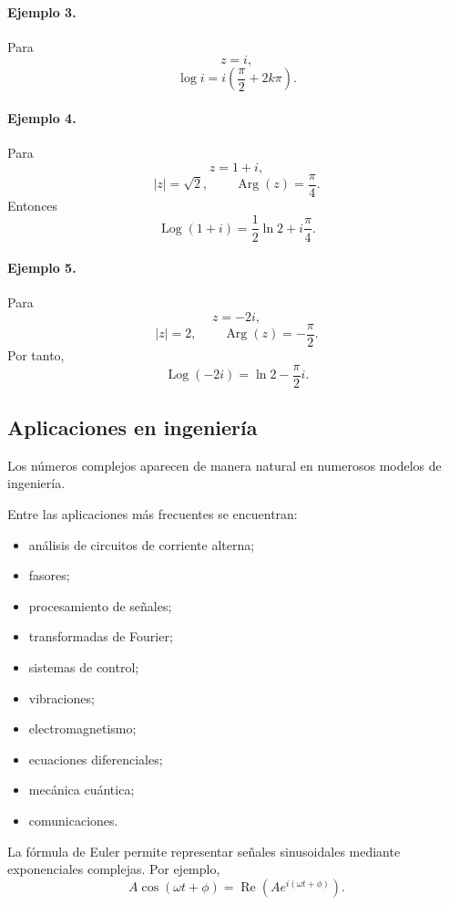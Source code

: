 \paragraph{Ejemplo 3.}
Para
\[
z=i,
\]
\[
\log i
=
i\left(
\frac{\pi}{2}+2k\pi
\right).
\]

\paragraph{Ejemplo 4.}
Para
\[
z=1+i,
\]
\[
|z|=\sqrt2,
\qquad
\operatorname{Arg}(z)=\frac{\pi}{4}.
\]
Entonces
\[
\operatorname{Log}(1+i)
=
\frac12\ln2
+
i\frac{\pi}{4}.
\]

\paragraph{Ejemplo 5.}
Para
\[
z=-2i,
\]
\[
|z|=2,
\qquad
\operatorname{Arg}(z)=-\frac{\pi}{2}.
\]
Por tanto,
\[
\operatorname{Log}(-2i)
=
\ln2-\frac{\pi}{2}i.
\]

\subsection{Aplicaciones en ingeniería}

Los números complejos aparecen de manera natural en numerosos modelos de
ingeniería.

Entre las aplicaciones más frecuentes se encuentran:
\begin{itemize}
    \item análisis de circuitos de corriente alterna;
    \item fasores;
    \item procesamiento de señales;
    \item transformadas de Fourier;
    \item sistemas de control;
    \item vibraciones;
    \item electromagnetismo;
    \item ecuaciones diferenciales;
    \item mecánica cuántica;
    \item comunicaciones.
\end{itemize}

La fórmula de Euler permite representar señales sinusoidales mediante
exponenciales complejas. Por ejemplo,
\[
A\cos(\omega t+\phi)
=
\operatorname{Re}
\left(
Ae^{i(\omega t+\phi)}
\right).
\]

